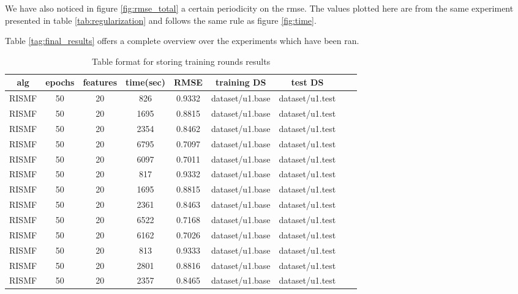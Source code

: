 \documentclass[11pt]{amsart}
\begin{document}
We have also noticed in figure \ref{fig:rmse_total} a certain periodicity on the rmse. The values plotted here are from the same experiment presented in table \ref{tab:regularization} and follows the same rule as figure \ref{fig:time}.


Table \ref{tag:final_results} offers a complete overview over the experiments which have been ran. 

  \begin{table}[ht]%
    \caption{Table format for storing training rounds results}
    \label{table:sqlite3_schema}\centering%
    \small\addtolength{\tabcolsep}{-1pt}
    \begin{tabular}{ccccccccc}
    \toprule%
    alg & epochs & features & time(sec) & RMSE & training DS   & test DS    \\ \toprule
    RISMF & 50 & 20 & 826 &  0.9332 & dataset/u1.base & dataset/u1.test \\
    RISMF & 50 & 20 & 1695 & 0.8815 & dataset/u1.base & dataset/u1.test\\
    RISMF & 50 & 20 & 2354 & 0.8462 & dataset/u1.base & dataset/u1.test \\
    RISMF & 50 & 20 & 6795 & 0.7097 & dataset/u1.base & dataset/u1.test\\
    RISMF & 50 & 20 & 6097 & 0.7011 & dataset/u1.base & dataset/u1.test\\
    RISMF & 50 & 20 & 817 &  0.9332 & dataset/u1.base & dataset/u1.test \\
    RISMF & 50 & 20 & 1695 & 0.8815 & dataset/u1.base & dataset/u1.test\\
    RISMF & 50 & 20 & 2361 & 0.8463 & dataset/u1.base & dataset/u1.test\\
    RISMF & 50 & 20 & 6522 & 0.7168 & dataset/u1.base & dataset/u1.test\\
    RISMF & 50 & 20 & 6162 & 0.7026 & dataset/u1.base & dataset/u1.test\\
    RISMF & 50 & 20 & 813 &  0.9333 & dataset/u1.base & dataset/u1.test \\
    RISMF & 50 & 20 & 2801 & 0.8816 & dataset/u1.base & dataset/u1.test\\
    RISMF & 50 & 20 & 2357 & 0.8465 & dataset/u1.base & dataset/u1.test\\

\end{tabular}
\end{table}
\end{document}
